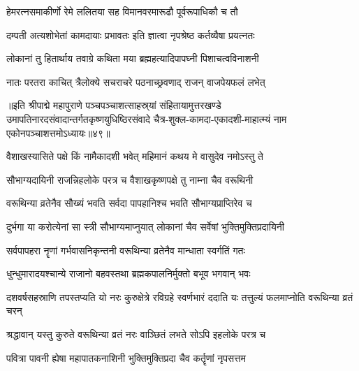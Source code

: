\twolineshloka
{हेमरत्नसमाकीर्णो रेमे ललितया सह}
{विमानवरमारूढौ पूर्वरूपाधिकौ च तौ}%

\twolineshloka
{दम्पती अत्यशोभेतां कामदायाः प्रभावतः}
{इति ज्ञात्वा नृपश्रेष्ठ कर्तव्यैषा प्रयत्नतः}%

\twolineshloka
{लोकानां तु हितार्थाय तवाग्रे कथिता मया}
{ब्रह्महत्यादिपापघ्नी पिशाचत्वविनाशनी}%

\twolineshloka
{नातः परतरा काचित् त्रैलोक्ये सचराचरे}
{पठनाच्छ्रवणाद् राजन् वाजपेयफलं लभेत्}%

॥इति श्रीपाद्मे महापुराणे पञ्चपञ्चाशत्साहस्र्यां संहितायामुत्तरखण्डे उमापतिनारदसंवादान्तर्गतकृष्णयुधिष्ठिरसंवादे चैत्र-शुक्ल-कामदा-एकादशी-माहात्म्यं नाम एकोनपञ्चाशत्तमोऽध्यायः॥४९॥

\genMangalaShloka

\hyperref[sec:ekadashi_mahatmyam_padma_puranam]{\closesub}
\clearpage

\label{sec:padma-vaishakha-krishna-varuthini ekadashi}

\ganapatyadiDhyanam
\padmaPuranam



\twolineshloka
{वैशाखस्यासिते पक्षे किं नामैकादशी भवेत्}
{महिमानं कथय मे वासुदेव नमोऽस्तु ते}%


\twolineshloka
{सौभाग्यदायिनी राजन्निहलोके परत्र च}
{वैशाखकृष्णपक्षे तु नाम्ना चैव वरूथिनी}%

\twolineshloka
{वरूथिन्या व्रतेनैव सौख्यं भवति सर्वदा}
{पापहानिश्च भवति सौभाग्यप्राप्तिरेव च}%

\twolineshloka
{दुर्भगा या करोत्येनां सा स्त्री सौभाग्यमाप्नुयात्}
{लोकानां चैव सर्वेषां भुक्तिमुक्तिप्रदायिनी}%

\twolineshloka
{सर्वपापहरा नॄणां गर्भवासनिकृन्तनी}
{वरूथिन्या व्रतेनैव मान्धाता स्वर्गतिं गतः}%

\twolineshloka
{धुन्धुमारादयश्चान्ये राजानो बहवस्तथा}
{ब्रह्मकपालनिर्मुक्तो बभूव भगवान् भवः}%

\threelineshloka
{दशवर्षसहस्राणि तपस्तप्यति यो नरः}
{कुरुक्षेत्रे  रविग्रहे स्वर्णभारं ददाति यः}
{तत्तुल्यं फलमाप्नोति वरूथिन्या व्रतं चरन्}%

\twolineshloka
{श्रद्धावान् यस्तु कुरुते वरूथिन्या व्रतं नरः}
{वाञ्छितं लभते सोऽपि इहलोके परत्र च}%

\twolineshloka
{पवित्रा पावनी ह्येषा महापातकनाशिनी}
{भुक्तिमुक्तिप्रदा चैव कर्तॄणां नृपसत्तम}%

